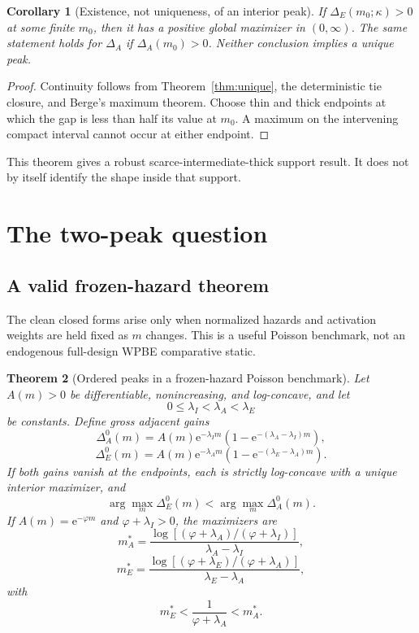 \documentclass[11pt]{article}
\newtheorem{theorem}{Theorem}
\newtheorem{corollary}[theorem]{Corollary}
\theoremstyle{definition}
\theoremstyle{remark}
\newcommand{\e}{\mathrm e}
\begin{document}
\begin{corollary}[Existence, not uniqueness, of an interior peak]
\label{cor:peakexist}
If $\Delta_E(m_0;\kappa)>0$ at some finite $m_0$, then it has a positive
global maximizer in $(0,\infty)$.  The same statement holds for $\Delta_A$ if
$\Delta_A(m_0)>0$.  Neither conclusion implies a unique peak.
\end{corollary}

\begin{proof}
Continuity follows from Theorem~\ref{thm:unique}, the deterministic tie
closure, and Berge's maximum theorem.  Choose thin and thick endpoints at
which the gap is less than half its value at $m_0$.  A maximum on the
intervening compact interval cannot occur at either endpoint.
\end{proof}

This theorem gives a robust scarce-intermediate-thick support result.  It does
not by itself identify the shape inside that support.

\section{The two-peak question}

\subsection{A valid frozen-hazard theorem}

The clean closed forms arise only when normalized hazards and activation
weights are held fixed as $m$ changes.  This is a useful Poisson benchmark,
not an endogenous full-design WPBE comparative static.

\begin{theorem}[Ordered peaks in a frozen-hazard Poisson benchmark]
\label{thm:frozen}
Let $A(m)>0$ be differentiable, nonincreasing, and log-concave, and let
\[
0\le\lambda_I<\lambda_A<\lambda_E
\]
be constants.  Define gross adjacent gains
\[
\Delta_A^0(m)=A(m)\e^{-\lambda_I m}
\left(1-\e^{-(\lambda_A-\lambda_I)m}\right),
\]
\[
\Delta_E^0(m)=A(m)\e^{-\lambda_A m}
\left(1-\e^{-(\lambda_E-\lambda_A)m}\right).
\]
If both gains vanish at the endpoints, each is strictly log-concave with a
unique interior maximizer, and
\[
\arg\max_m\Delta_E^0(m)<\arg\max_m\Delta_A^0(m).
\]
If $A(m)=\e^{-\varphi m}$ and $\varphi+\lambda_I>0$, the maximizers are
\[
m_A^*=\frac{\log[(\varphi+\lambda_A)/(\varphi+\lambda_I)]}
{\lambda_A-\lambda_I},
\]
\[
m_E^*=\frac{\log[(\varphi+\lambda_E)/(\varphi+\lambda_A)]}
{\lambda_E-\lambda_A},
\]
with
\[
m_E^*<\frac1{\varphi+\lambda_A}<m_A^*.
\]
\end{theorem}
\end{document}
